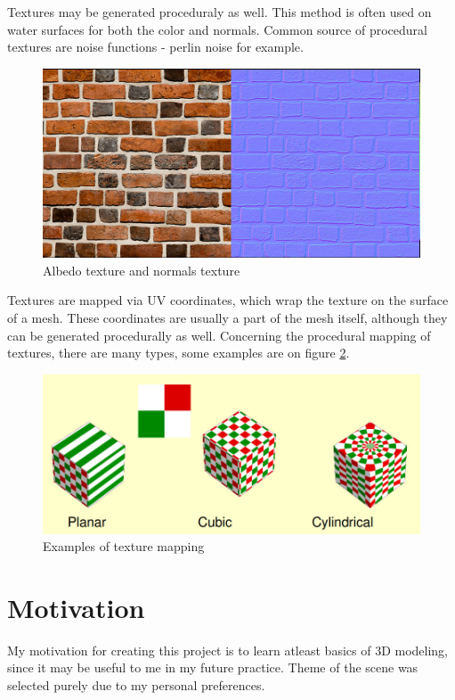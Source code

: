 \documentclass[12pt,a4paper,titlepage,final]{report}
\begin{document}
Textures may be generated proceduraly as well. This method is often used on water surfaces for both the color and normals. Common source of procedural textures are noise functions - perlin noise for example.

\begin{figure}[H]
    \centering
    \includegraphics{images/textures.jpg}
    \caption{Albedo texture and normals texture \cite{wikipedia_2021}}
    \label{fig:cat_clark_subdiv}
\end{figure}

Textures are mapped via UV coordinates, which wrap the texture on the surface of a mesh. These coordinates are usually a part of the mesh itself, although they can be generated procedurally as well. Concerning the procedural mapping of textures, there are many types, some examples are on figure \ref{fig:mapping}.

\begin{figure}[H]
    \centering
    \includegraphics{images/mapping.jpg}
    \caption{Examples of texture mapping \cite{mapping}}
    \label{fig:mapping}
\end{figure}


\section{Motivation}
My motivation for creating this project is to learn atleast basics of 3D modeling, since it may be useful to me in my future practice. Theme of the scene was selected purely due to my personal preferences.
\end{document}
